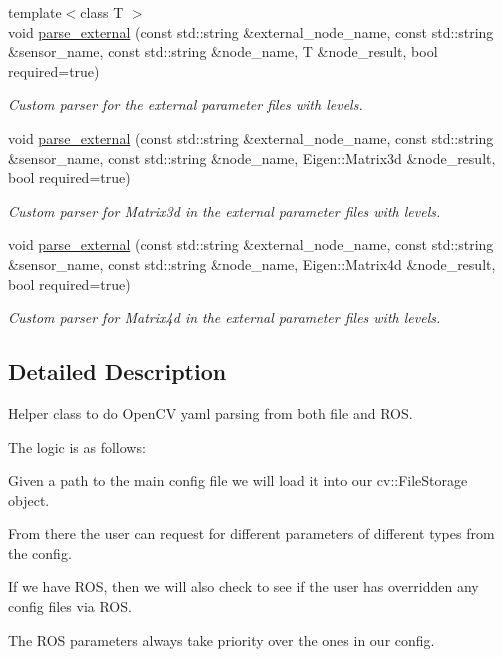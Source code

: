 \begin{DoxyCompactItemize}
{\footnotesize template$<$class T $>$ }\\void \hyperlink{classov__core_1_1YamlParser_ac955d674ec792557a9f53a4b613af0cb}{parse\+\_\+external} (const std\+::string \&external\+\_\+node\+\_\+name, const std\+::string \&sensor\+\_\+name, const std\+::string \&node\+\_\+name, T \&node\+\_\+result, bool required=true)
\begin{DoxyCompactList}\small\item\em Custom parser for the external parameter files with levels. \end{DoxyCompactList}\item 
void \hyperlink{classov__core_1_1YamlParser_a72bdbe517f63793e36e8ec8faacfc9f5}{parse\+\_\+external} (const std\+::string \&external\+\_\+node\+\_\+name, const std\+::string \&sensor\+\_\+name, const std\+::string \&node\+\_\+name, Eigen\+::\+Matrix3d \&node\+\_\+result, bool required=true)
\begin{DoxyCompactList}\small\item\em Custom parser for Matrix3d in the external parameter files with levels. \end{DoxyCompactList}\item 
void \hyperlink{classov__core_1_1YamlParser_a09a826b21ab5de606a5c82472e957e8c}{parse\+\_\+external} (const std\+::string \&external\+\_\+node\+\_\+name, const std\+::string \&sensor\+\_\+name, const std\+::string \&node\+\_\+name, Eigen\+::\+Matrix4d \&node\+\_\+result, bool required=true)
\begin{DoxyCompactList}\small\item\em Custom parser for Matrix4d in the external parameter files with levels. \end{DoxyCompactList}\end{DoxyCompactItemize}


\subsection{Detailed Description}
Helper class to do Open\+CV yaml parsing from both file and R\+OS. 

The logic is as follows\+:
\begin{DoxyItemize}
\item Given a path to the main config file we will load it into our cv\+::\+File\+Storage object.
\item From there the user can request for different parameters of different types from the config.
\item If we have R\+OS, then we will also check to see if the user has overridden any config files via R\+OS.
\item The R\+OS parameters always take priority over the ones in our config.
\end{DoxyItemize}

